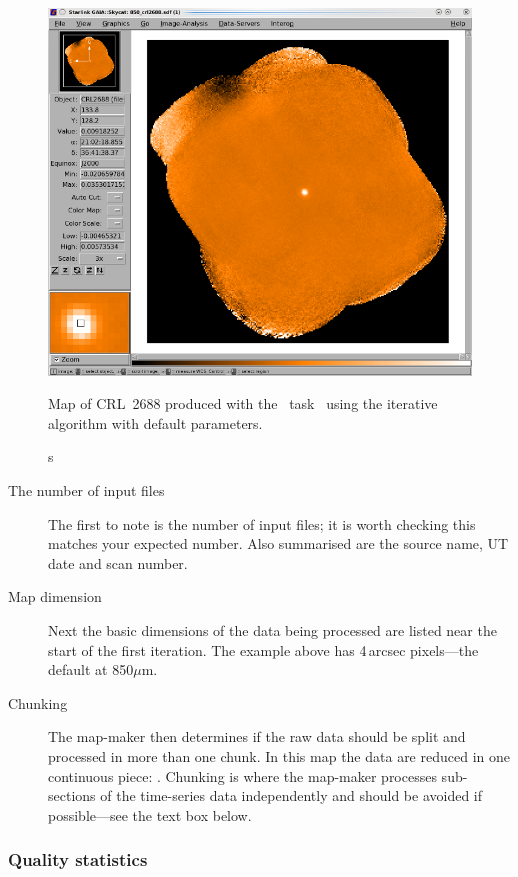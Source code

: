\begin{figure}
\begin{center}
\includegraphics[width=0.7\linewidth]{sc21_crl2688}
\caption[CRL~2688 produced with \makemap]s{
  Map of CRL~2688 produced with the \smurf\ task \makemap\ using the
  iterative algorithm with default parameters. \label{fig:itermap}}
\end{center}
\end{figure}

\begin{description}
\item[The number of input files] The first to note is the number of
  input files; it is worth checking this matches your expected
  number. Also summarised are the source name, UT date and scan
  number.

\item[Map dimension] Next the basic dimensions of the data being
  processed are listed near the start of the first iteration. The
  example above has 4\,arcsec pixels---the default at 850$\mu$m.


\item[Chunking] The map-maker then determines if the raw data should
  be split and processed in more than one chunk. In this map the data
  are reduced in one continuous piece: . Chunking is where the map-maker processes sub-sections of the
  time-series data independently and should be avoided if
  possible---see the text box below.
\end{description}


\subsubsection*{Quality statistics}

